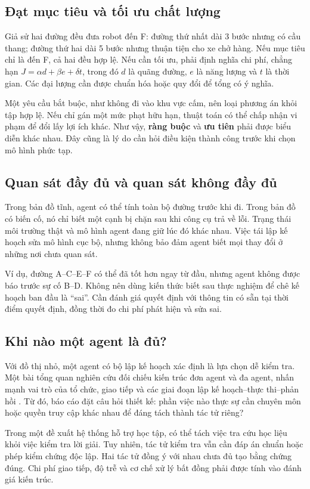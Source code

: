 \documentclass[12pt,a4paper]{article}
\begin{document}
\subsection{Đạt mục tiêu và tối ưu chất lượng}
Giả sử hai đường đều đưa robot đến F: đường thứ nhất dài 3 bước nhưng có cầu thang;
đường thứ hai dài 5 bước nhưng thuận tiện cho xe chở hàng. Nếu mục tiêu chỉ là đến F,
cả hai đều hợp lệ. Nếu cần tối ưu, phải định nghĩa chi phí, chẳng hạn
$J=\alpha d+\beta e+\delta t$, trong đó $d$ là quãng đường, $e$ là năng lượng và $t$
là thời gian. Các đại lượng cần được chuẩn hóa hoặc quy đổi để tổng có ý nghĩa.

Một yêu cầu bắt buộc, như không đi vào khu vực cấm, nên loại phương án khỏi tập hợp lệ.
Nếu chỉ gán một mức phạt hữu hạn, thuật toán có thể chấp nhận vi phạm để đổi lấy lợi ích
khác. Như vậy, \textbf{ràng buộc} và \textbf{ưu tiên} phải được biểu diễn khác nhau.
Đây cũng là lý do cần hỏi điều kiện thành công trước khi chọn mô hình phức tạp.

\subsection{Quan sát đầy đủ và quan sát không đầy đủ}
Trong bản đồ tĩnh, agent có thể tính toàn bộ đường trước khi đi. Trong bản đồ có biến
cố, nó chỉ biết một cạnh bị chặn sau khi công cụ trả về lỗi. Trạng thái môi trường thật
và mô hình agent đang giữ lúc đó khác nhau. Việc tái lập kế hoạch sửa mô hình cục bộ,
nhưng không bảo đảm agent biết mọi thay đổi ở những nơi chưa quan sát.

Ví dụ, đường A--C--E--F có thể đã tốt hơn ngay từ đầu, nhưng agent không được báo trước
sự cố B--D. Không nên dùng kiến thức biết sau thực nghiệm để chê kế hoạch ban đầu là
``sai''. Cần đánh giá quyết định với thông tin có sẵn tại thời điểm quyết định, đồng thời
đo chi phí phát hiện và sửa sai.

\subsection{Khi nào một agent là đủ?}
Với đồ thị nhỏ, một agent có bộ lập kế hoạch xác định là lựa chọn dễ kiểm tra.
Một bài tổng quan nghiên cứu đối chiếu kiến trúc đơn agent và đa agent, nhấn mạnh vai trò
của tổ chức, giao tiếp và các giai đoạn lập kế hoạch--thực thi--phản hồi \cite{survey}.
Từ đó, báo cáo đặt câu hỏi thiết kế: phần việc nào thực sự cần chuyên môn hoặc quyền
truy cập khác nhau để đáng tách thành tác tử riêng?

Trong một đề xuất hệ thống hỗ trợ học tập, có thể tách việc tra cứu học liệu khỏi việc
kiểm tra lời giải. Tuy nhiên, tác tử kiểm tra vẫn cần đáp án chuẩn hoặc phép kiểm chứng
độc lập. Hai tác tử đồng ý với nhau chưa đủ tạo bằng chứng đúng. Chi phí giao tiếp,
độ trễ và cơ chế xử lý bất đồng phải được tính vào đánh giá kiến trúc.
\end{document}
